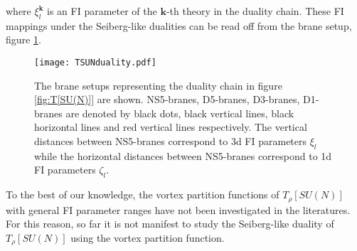 \documentclass[a4paper,11pt]{article}
\begin{document}
where $\xi^{\mathbf k}_l$ is an FI parameter of the $\mathbf k$-th theory in the duality chain. These FI mappings under the Seiberg-like dualities can be read off from the brane setup, figure \ref{fig:T[SU(N)] duality}.
%
\begin{figure}[tbp]
\centering %
\texttt{[image: TSUNduality.pdf]}
\caption{\label{fig:T[SU(N)] duality} The brane setups representing the duality chain in figure \ref{fig:T[SU(N)]} are shown. NS5-branes, D5-branes, D3-branes, D1-branes are denoted by black dots, black vertical lines, black horizontal lines and red vertical lines respectively. The vertical distances between NS5-branes correspond to 3d FI parameters $\xi_l$ while the horizontal distances between NS5-branes correspond to 1d FI parameters $\zeta_l$.}
\end{figure}
%
To the best of our knowledge, the vortex partition functions of $T_\rho [SU(N)]$ with general FI parameter ranges have not been investigated in the literatures. For this reason, so far it is not manifest to study the Seiberg-like duality of $T_\rho [SU(N)]$ using the vortex partition function.
\end{document}
